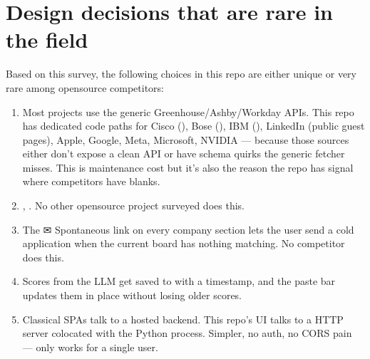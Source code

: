 \documentclass[a4paper,11pt,english]{sphinxmanual}
\begin{document}
\section{Design decisions that are rare in the field}
\label{\detokenize{analysis:design-decisions-that-are-rare-in-the-field}}
\sphinxAtStartPar
Based on this survey, the following choices in this repo are either
unique or very rare among open\sphinxhyphen{}source competitors:
\begin{enumerate}
%
\item {} 
\sphinxAtStartPar
{}
Most projects use the generic Greenhouse/Ashby/Workday APIs. This
repo has dedicated code paths for Cisco (), Bose
(), IBM (), LinkedIn (public guest pages),
Apple, Google, Meta, Microsoft, NVIDIA — because those sources either
don’t expose a clean API or have schema quirks the generic fetcher
misses. This is maintenance cost but it’s also the reason the repo
has signal where competitors have blanks.

\item {} 
\sphinxAtStartPar
{} , .
No other open\sphinxhyphen{}source project surveyed does this.

\item {} 
\sphinxAtStartPar
{} The ✉ Spontaneous link on
every company section lets the user send a cold application when the
current board has nothing matching. No competitor does this.

\item {} 
\sphinxAtStartPar
{} Scores from the LLM get
saved to  with a timestamp, and the paste
bar updates them in place without losing older scores.

\item {} 
\sphinxAtStartPar
{}
Classical SPAs talk to a hosted backend. This repo’s UI talks to a
 HTTP server co\sphinxhyphen{}located with the Python process.
Simpler, no auth, no CORS pain — only works for a single user.

\end{enumerate}
\end{document}

